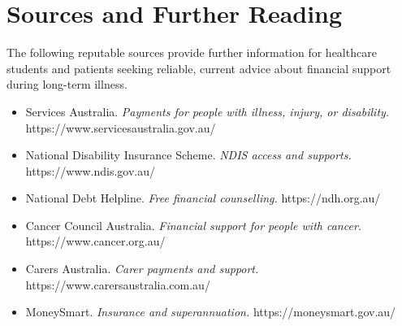 \section*{Sources and Further Reading}
The following reputable sources provide further information for healthcare students and patients seeking reliable, current advice about financial support during long-term illness.
\begin{itemize}
    \item Services Australia. \textit{Payments for people with illness, injury, or disability.} https://www.servicesaustralia.gov.au/
    \item National Disability Insurance Scheme. \textit{NDIS access and supports.} https://www.ndis.gov.au/
    \item National Debt Helpline. \textit{Free financial counselling.} https://ndh.org.au/
    \item Cancer Council Australia. \textit{Financial support for people with cancer.} https://www.cancer.org.au/
    \item Carers Australia. \textit{Carer payments and support.} https://www.carersaustralia.com.au/
    \item MoneySmart. \textit{Insurance and superannuation.} https://moneysmart.gov.au/
\end{itemize}
